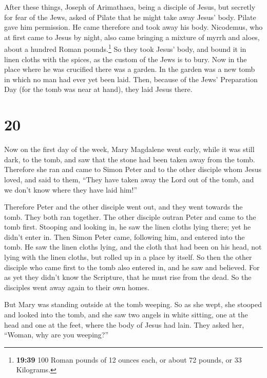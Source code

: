  After these things, Joseph of Arimathaea, being a
disciple of Jesus, but secretly for fear of the Jews, asked of Pilate
that he might take away Jesus' body. Pilate gave him permission. He came
therefore and took away his body.  Nicodemus, who at
first came to Jesus by night, also came bringing a mixture of myrrh and
aloes, about a hundred Roman pounds.\footnote{\textbf{19:39} 100 Roman
  pounds of 12 ounces each, or about 72 pounds, or 33 Kilograms.}
 So they took Jesus' body, and bound it in linen cloths
with the spices, as the custom of the Jews is to bury. 
Now in the place where he was crucified there was a garden. In the
garden was a new tomb in which no man had ever yet been laid.
 Then, because of the Jews' Preparation Day (for the tomb
was near at hand), they laid Jesus there.

\hypertarget{section-19}{%
\section{20}\label{section-19}}

 Now on the first day of the week, Mary Magdalene went
early, while it was still dark, to the tomb, and saw that the stone had
been taken away from the tomb.  Therefore she ran and came
to Simon Peter and to the other disciple whom Jesus loved, and said to
them, ``They have taken away the Lord out of the tomb, and we don't know
where they have laid him!''

 Therefore Peter and the other disciple went out, and they
went towards the tomb.  They both ran together. The other
disciple outran Peter and came to the tomb first. 
Stooping and looking in, he saw the linen cloths lying there; yet he
didn't enter in.  Then Simon Peter came, following him,
and entered into the tomb. He saw the linen cloths lying, 
and the cloth that had been on his head, not lying with the linen
cloths, but rolled up in a place by itself.  So then the
other disciple who came first to the tomb also entered in, and he saw
and believed.  For as yet they didn't know the Scripture,
that he must rise from the dead.  So the disciples went
away again to their own homes.

 But Mary was standing outside at the tomb weeping. So as
she wept, she stooped and looked into the tomb,  and she
saw two angels in white sitting, one at the head and one at the feet,
where the body of Jesus had lain.  They asked her,
``Woman, why are you weeping?''


